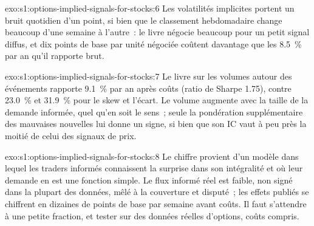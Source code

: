 \begin{solution}{exo:s1:options-implied-signals-for-stocks:6}
Les volatilités implicites portent un bruit quotidien d'un point, si bien que le classement hebdomadaire change beaucoup d'une semaine à l'autre~: le livre négocie beaucoup pour un petit
signal diffus, et dix points de base par unité négociée coûtent davantage que les 8.5~\% par an qu'il rapporte brut.
\end{solution}

\begin{solution}{exo:s1:options-implied-signals-for-stocks:7}
Le livre sur les volumes autour des événements rapporte 9.1~\% par an après coûts (ratio de Sharpe 1.75), contre 23.0~\% et 31.9~\% pour le skew et l'écart. Le volume augmente avec la taille de
la demande informée, quel qu'en soit le sens~; seule la pondération supplémentaire des mauvaises nouvelles lui donne un signe, si bien que son IC vaut à peu près la moitié de celui des signaux de prix.
\end{solution}

\begin{solution}{exo:s1:options-implied-signals-for-stocks:8}
Le chiffre provient d'un modèle dans lequel les traders informés connaissent la surprise dans son intégralité et où leur demande en est une fonction simple. Le flux informé réel est faible,
non signé dans la plupart des données, mêlé à la couverture et disputé~; les effets publiés se chiffrent en dizaines de points de base par semaine avant coûts. Il faut s'attendre à une
petite fraction, et tester sur des données réelles d'options, coûts compris.
\end{solution}

